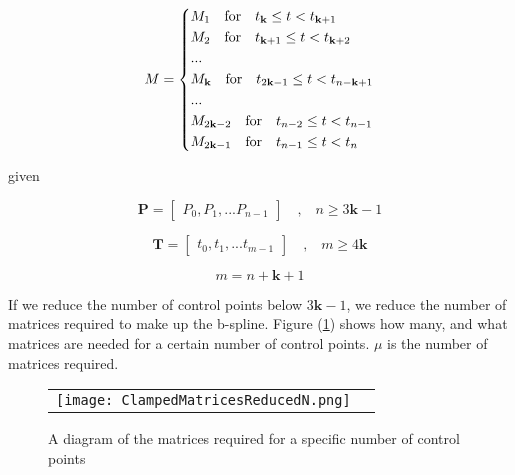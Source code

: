 \documentclass{article}
\begin{document}
\begin{equation} 
        M = \begin{dcases} 
            M_{1} \quad \text{for} \quad t_{\textbf{k}} \leq t < t_{\textbf{k}+1} \\
            M_{2} \quad \text{for} \quad t_{\textbf{k}+1} \leq t < t_{\textbf{k}+2} \\
            ...\\
            M_{\textbf{k}} \quad \text{for} \quad t_{2\textbf{k}-1} \leq t < t_{n-\textbf{k}+1}\\
            ...\\
            M_{2\textbf{k}-2} \quad \text{for} \quad t_{n-2} \leq t < t_{n-1}\\
            M_{2\textbf{k}-1} \quad \text{for} \quad t_{n-1} \leq t < t_{n}
        \end{dcases}
\end{equation}

given

    \begin{equation}
        \textbf{P} = \begin{bmatrix} P_0, P_1, ... P_{n-1} \end{bmatrix} \quad \text{,} \quad n \geq 3\textbf{k}-1
    \end{equation}
    
    \begin{equation}
        \textbf{T} = \begin{bmatrix} t_0, t_1, ... t_{m-1} \end{bmatrix} \quad \text{,} \quad m \geq 4\textbf{k}
    \end{equation}

\begin{equation}
    m = n+\textbf{k}+1
\end{equation}

If we reduce the number of control points below \(3\textbf{k}-1\), we reduce the number of matrices required to make up the b-spline. Figure (\ref{Fig:ClampedMatricesWithReducedN}) shows how many, and what matrices are needed for a certain number of control points. \(\mu\) is the number of matrices required.

\begin{figure}[h]
\begin{tabular}{ll}
\texttt{[image: ClampedMatricesReducedN.png]}
\end{tabular}
\caption{A diagram of the matrices required for a specific number of control points}
\label{Fig:ClampedMatricesWithReducedN}
\end{figure}
\end{document}
